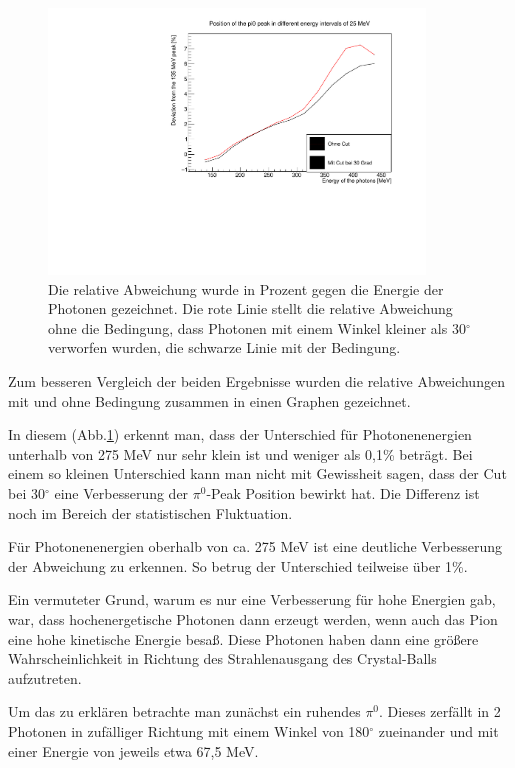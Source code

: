 \documentclass[a4paper,11pt,oneside,final,german,openbib,pdftex]{scrbook}
\begin{document}
{\begin{figure}[h!]
	\begin{center}
		\includegraphics[width=100mm]{20172803SymmetricUnchargedDeviationCut}
		\caption{Die relative Abweichung wurde in Prozent gegen die Energie der Photonen gezeichnet. Die rote Linie stellt die relative Abweichung ohne die Bedingung, dass Photonen mit einem Winkel kleiner als 30$^{\circ}$ verworfen wurden, die schwarze Linie mit der Bedingung.}
		\label{fig:Vernachlaessigung-Detektoren-am-Rand}
	\end{center}
\end{figure}

Zum besseren Vergleich der beiden Ergebnisse wurden die relative Abweichungen mit und ohne Bedingung zusammen in einen Graphen gezeichnet. 

In diesem (Abb.\ref{fig:Vernachlaessigung-Detektoren-am-Rand}) erkennt man, dass der Unterschied f\"ur Photonenenergien unterhalb von 275 MeV nur sehr klein ist und weniger als 0,1\% betr\"agt. Bei einem so kleinen Unterschied kann man nicht mit Gewissheit sagen, dass der Cut bei 30$^{\circ}$ eine Verbesserung der $\pi^0$-Peak Position bewirkt hat. Die Differenz ist noch im Bereich der statistischen Fluktuation. 

F\"ur Photonenenergien oberhalb von ca. 275 MeV ist eine deutliche Verbesserung der Abweichung zu erkennen. So betrug der Unterschied teilweise über 1\%.

Ein vermuteter Grund, warum es nur eine Verbesserung für hohe Energien gab, war, dass hochenergetische Photonen dann erzeugt werden, wenn auch das Pion eine hohe kinetische Energie besa{\ss}. Diese Photonen haben dann eine gr\"o{\ss}ere Wahrscheinlichkeit in Richtung des Strahlenausgang des Crystal-Balls aufzutreten.

Um das zu erkl\"aren betrachte man zun\"achst ein ruhendes $\pi^0$. Dieses zerf\"allt in 2 Photonen in zuf\"alliger Richtung mit einem Winkel von 180$^{\circ}$ zueinander und mit einer Energie von jeweils etwa 67,5 MeV. 

}
\end{document}
